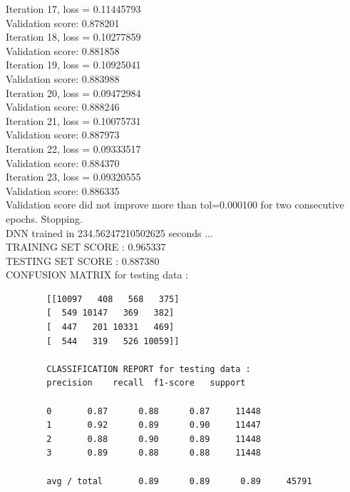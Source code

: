 \documentclass[oneside,a4paper,12pt]{report}
\begin{document}
\begin{normalsize}
\begin{itemize}
		Iteration 17, loss = 0.11445793\\
		Validation score: 0.878201\\
		Iteration 18, loss = 0.10277859\\
		Validation score: 0.881858\\
		Iteration 19, loss = 0.10925041\\
		Validation score: 0.883988\\
		Iteration 20, loss = 0.09472984\\
		Validation score: 0.888246\\
		Iteration 21, loss = 0.10075731\\
		Validation score: 0.887973\\
		Iteration 22, loss = 0.09333517\\
		Validation score: 0.884370\\
		Iteration 23, loss = 0.09320555\\
		Validation score: 0.886335\\
		Validation score did not improve more than tol=0.000100 for two consecutive epochs. Stopping.\\
		DNN trained in 234.56247210502625 seconds ...\\
		TRAINING SET SCORE : 0.965337\\
		TESTING SET SCORE : 0.887380\\
		CONFUSION MATRIX for testing data : \\
		\begin{verbatim}
		[[10097   408   568   375]
		[  549 10147   369   382]
		[  447   201 10331   469]
		[  544   319   526 10059]]

		CLASSIFICATION REPORT for testing data :
		precision    recall  f1-score   support
		
		0       0.87      0.88      0.87     11448
		1       0.92      0.89      0.90     11447
		2       0.88      0.90      0.89     11448
		3       0.89      0.88      0.88     11448
		
		avg / total       0.89      0.89      0.89     45791
		\end{verbatim}
		

\end{itemize}
\end{normalsize}
\end{document}
